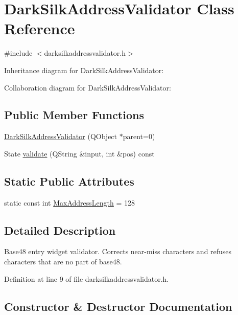 \hypertarget{class_dark_silk_address_validator}{}\section{Dark\+Silk\+Address\+Validator Class Reference}
\label{class_dark_silk_address_validator}


{\ttfamily \#include $<$darksilkaddressvalidator.\+h$>$}



Inheritance diagram for Dark\+Silk\+Address\+Validator\+:


Collaboration diagram for Dark\+Silk\+Address\+Validator\+:
\subsection*{Public Member Functions}
\begin{DoxyCompactItemize}
\item 
\hyperlink{class_dark_silk_address_validator_ab3c14a9bb5c040892b7abc8436f0d03f}{Dark\+Silk\+Address\+Validator} (Q\+Object $\ast$parent=0)
\item 
State \hyperlink{class_dark_silk_address_validator_a82edb3fea291efd97c11ee3f0b2a06a7}{validate} (Q\+String \&input, int \&pos) const 
\end{DoxyCompactItemize}
\subsection*{Static Public Attributes}
\begin{DoxyCompactItemize}
\item 
static const int \hyperlink{class_dark_silk_address_validator_ade0e41d2e163261099b876a880249519}{Max\+Address\+Length} = 128
\end{DoxyCompactItemize}


\subsection{Detailed Description}
Base48 entry widget validator. Corrects near-\/miss characters and refuses characters that are no part of base48. 

Definition at line 9 of file darksilkaddressvalidator.\+h.



\subsection{Constructor \& Destructor Documentation}
\hypertarget{class_dark_silk_address_validator_ab3c14a9bb5c040892b7abc8436f0d03f}{}
